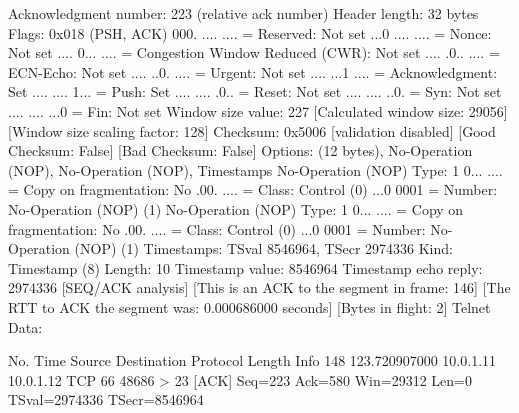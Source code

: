     Acknowledgment number: 223    (relative ack number)
    Header length: 32 bytes
    Flags: 0x018 (PSH, ACK)
        000. .... .... = Reserved: Not set
        ...0 .... .... = Nonce: Not set
        .... 0... .... = Congestion Window Reduced (CWR): Not set
        .... .0.. .... = ECN-Echo: Not set
        .... ..0. .... = Urgent: Not set
        .... ...1 .... = Acknowledgment: Set
        .... .... 1... = Push: Set
        .... .... .0.. = Reset: Not set
        .... .... ..0. = Syn: Not set
        .... .... ...0 = Fin: Not set
    Window size value: 227
    [Calculated window size: 29056]
    [Window size scaling factor: 128]
    Checksum: 0x5006 [validation disabled]
        [Good Checksum: False]
        [Bad Checksum: False]
    Options: (12 bytes), No-Operation (NOP), No-Operation (NOP), Timestamps
        No-Operation (NOP)
            Type: 1
                0... .... = Copy on fragmentation: No
                .00. .... = Class: Control (0)
                ...0 0001 = Number: No-Operation (NOP) (1)
        No-Operation (NOP)
            Type: 1
                0... .... = Copy on fragmentation: No
                .00. .... = Class: Control (0)
                ...0 0001 = Number: No-Operation (NOP) (1)
        Timestamps: TSval 8546964, TSecr 2974336
            Kind: Timestamp (8)
            Length: 10
            Timestamp value: 8546964
            Timestamp echo reply: 2974336
    [SEQ/ACK analysis]
        [This is an ACK to the segment in frame: 146]
        [The RTT to ACK the segment was: 0.000686000 seconds]
        [Bytes in flight: 2]
Telnet
    Data: 

No.     Time           Source                Destination           Protocol Length Info
    148 123.720907000  10.0.1.11             10.0.1.12             TCP      66     48686 > 23 [ACK] Seq=223 Ack=580 Win=29312 Len=0 TSval=2974336 TSecr=8546964

